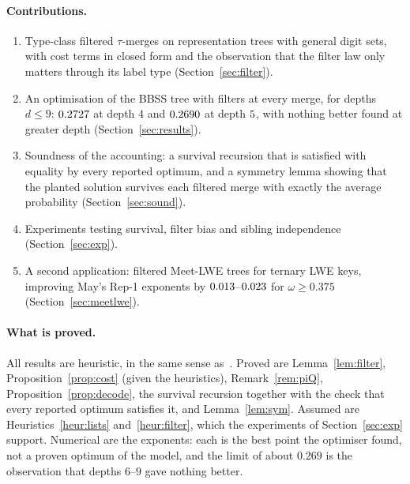 \documentclass[11pt]{article}
\theoremstyle{definition}
\theoremstyle{remark}
\newif\ifincludemeetlwe \includemeetlwetrue  %
\begin{document}
\paragraph{Contributions.}
\begin{enumerate}
\item Type-class filtered $\tau$-merges on representation trees with general digit sets, with cost terms in closed
form and the observation that the filter law only matters through its label type (Section~\ref{sec:filter}).
\item An optimisation of the BBSS tree with filters at every merge, for depths $d\le9$: $0.2727$ at depth $4$
and $0.2690$ at depth $5$, with nothing better found at greater depth (Section~\ref{sec:results}).
\item Soundness of the accounting: a survival recursion that is satisfied with equality by every reported optimum,
and a symmetry lemma showing that the planted solution survives each filtered merge with exactly the average
probability (Section~\ref{sec:sound}).
\item Experiments testing survival, filter bias and sibling independence (Section~\ref{sec:exp}).
\ifincludemeetlwe
\item A second application: filtered Meet-LWE trees for ternary LWE keys, improving May's Rep-1 exponents by
$0.013$--$0.023$ for $\omega\ge0.375$ (Section~\ref{sec:meetlwe}).
\fi
\end{enumerate}
\paragraph{What is proved.} All results are heuristic, in the same sense as~\cite{HGJ10,BCJ11,BBSS20}. Proved are
Lemma~\ref{lem:filter}, Proposition~\ref{prop:cost} (given the heuristics), Remark~\ref{rem:piQ},
Proposition~\ref{prop:decode}, the survival recursion together with the check that every reported optimum satisfies
it, and Lemma~\ref{lem:sym}. Assumed are Heuristics~\ref{heur:lists} and~\ref{heur:filter}, which the experiments of
Section~\ref{sec:exp} support. Numerical are the exponents: each is the best point the optimiser found, not a proven
optimum of the model, and the limit of about $0.269$ is the observation that depths $6$--$9$ gave nothing better.
\end{document}

